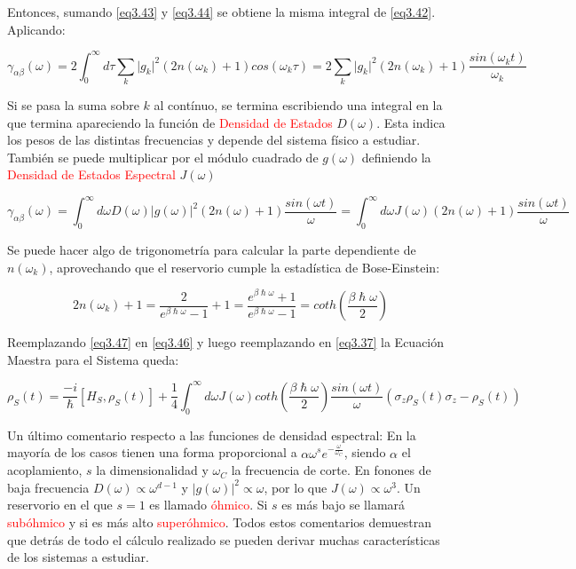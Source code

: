 \documentclass{book}
\begin{document}
Entonces, sumando \ref{eq3.43} y \ref{eq3.44} se obtiene la misma integral de \ref{eq3.42}. Aplicando:

\begin{equation}\label{eq3.45}\gamma_{\alpha\beta}(\omega)=2\int_0^{\infty} d\tau \sum_k \lvert g_k\rvert^2(2n(\omega_k)+1)cos(\omega_k \tau)=2\sum_k\lvert g_k\rvert^2(2n(\omega_k)+1)\frac{sin(\omega_k t)}{\omega_k}\end{equation}

Si se pasa la suma sobre $k$ al contínuo, se termina escribiendo una integral en la que termina apareciendo la función de \textcolor{red}{Densidad de Estados} $D(\omega)$. Esta indica los pesos de las distintas frecuencias y depende del sistema físico a estudiar. También se puede multiplicar por el módulo cuadrado de $g(\omega)$ definiendo la \textcolor{red}{Densidad de Estados Espectral}
$J(\omega)$

\begin{equation}\label{eq3.46}\gamma_{\alpha\beta}(\omega)=\int_0^\infty d\omega D(\omega)\lvert g(\omega)\rvert^2(2n(\omega)+1)\frac{sin(\omega t)}{\omega}=\int_0^\infty d\omega J(\omega)(2n(\omega)+1)\frac{sin(\omega t)}{\omega}\end{equation}

Se puede hacer algo de trigonometría para calcular la parte dependiente de $n(\omega_k)$, aprovechando que el reservorio cumple la estadística de Bose-Einstein:

\begin{equation}\label{eq3.47}2n(\omega_k)+1=\frac{2}{e^{\beta\hslash\omega}-1}+1=\frac{e^{\beta\hslash\omega}+1}{e^{\beta\hslash\omega}-1}=coth(\frac{\beta\hslash\omega}{2})\end{equation}

Reemplazando \ref{eq3.47} en \ref{eq3.46} y luego reemplazando en \ref{eq3.37} la Ecuación Maestra para el Sistema queda:

\begin{equation}\label{eq3.48}\rho_S(t)=\frac{-i}{\hslash}[H_S,\rho_S(t)]+\frac{1}{4}\int_0^\infty d\omega J(\omega)coth(\frac{\beta\hslash\omega}{2})\frac{sin(\omega t)}{\omega}(\sigma_z\rho_S(t)\sigma_z-\rho_S(t))\end{equation}

Un último comentario respecto a las funciones de densidad espectral: En la mayoría de los casos tienen una forma proporcional a $\alpha\omega^se^{-\frac{\omega}{\omega_C}}$, siendo $\alpha$ el acoplamiento, $s$ la dimensionalidad y $\omega_C$ la frecuencia de corte. En fonones de baja frecuencia $D(\omega)\propto \omega^{d-1}$ y $\lvert g(\omega)\rvert^2 \propto \omega$, por lo que $J(\omega)\propto \omega^3$. Un reservorio en el que $s=1$ es llamado \textcolor{red}{óhmico}. Si $s$ es más bajo se llamará \textcolor{red}{subóhmico} y si es más alto \textcolor{red}{superóhmico}. Todos estos comentarios demuestran que detrás de todo el cálculo realizado se pueden derivar muchas características de los sistemas a estudiar.
\end{document}
